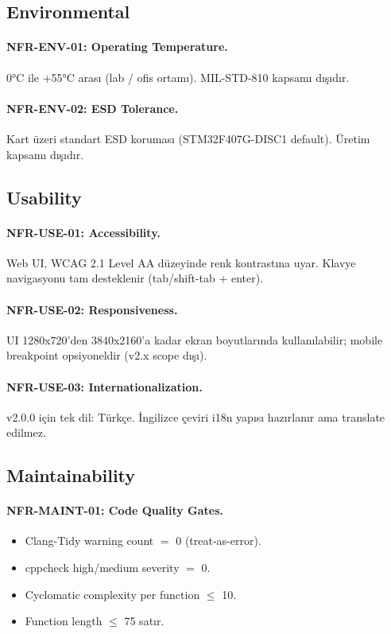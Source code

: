 \subsection{Environmental}

\paragraph{NFR-ENV-01: Operating Temperature.}
0°C ile +55°C arası (lab / ofis ortamı). MIL-STD-810 kapsamı dışıdır.

\paragraph{NFR-ENV-02: ESD Tolerance.}
Kart üzeri standart ESD koruması (STM32F407G-DISC1 default). Üretim kapsamı dışıdır.

\subsection{Usability}

\paragraph{NFR-USE-01: Accessibility.}
Web UI, WCAG 2.1 Level AA düzeyinde renk kontrastına uyar. Klavye navigasyonu tam desteklenir (tab/shift-tab + enter).

\paragraph{NFR-USE-02: Responsiveness.}
UI 1280x720'den 3840x2160'a kadar ekran boyutlarında kullanılabilir; mobile breakpoint opsiyoneldir (v2.x scope dışı).

\paragraph{NFR-USE-03: Internationalization.}
v2.0.0 için tek dil: Türkçe. İngilizce çeviri i18n yapısı hazırlanır ama translate edilmez.

\subsection{Maintainability}

\paragraph{NFR-MAINT-01: Code Quality Gates.}
\begin{itemize}
    \item Clang-Tidy warning count $=$ 0 (treat-as-error).
    \item cppcheck high/medium severity $=$ 0.
    \item Cyclomatic complexity per function $\leq$ 10.
    \item Function length $\leq$ 75 satır.
\end{itemize}


